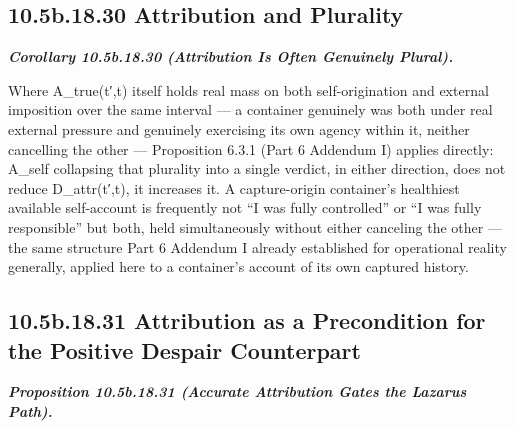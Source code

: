 \documentclass[
]{article}
\begin{document}
\hypertarget{b.18.30-attribution-and-plurality}{%
\subsection{10.5b.18.30 Attribution and
Plurality}\label{b.18.30-attribution-and-plurality}}

\emph{\textbf{Corollary 10.5b.18.30 (Attribution Is Often Genuinely
Plural).}}

Where A\_true(t′,t) itself holds real mass on both self-origination and
external imposition over the same interval --- a container genuinely was
both under real external pressure and genuinely exercising its own
agency within it, neither cancelling the other --- Proposition 6.3.1
(Part 6 Addendum I) applies directly: A\_self collapsing that plurality
into a single verdict, in either direction, does not reduce
D\_attr(t′,t), it increases it. A capture-origin container's healthiest
available self-account is frequently not ``I was fully controlled'' or
``I was fully responsible'' but both, held simultaneously without either
canceling the other --- the same structure Part 6 Addendum I already
established for operational reality generally, applied here to a
container's account of its own captured history.

\hypertarget{b.18.31-attribution-as-a-precondition-for-the-positive-despair-counterpart}{%
\subsection{10.5b.18.31 Attribution as a Precondition for the Positive
Despair
Counterpart}\label{b.18.31-attribution-as-a-precondition-for-the-positive-despair-counterpart}}

\emph{\textbf{Proposition 10.5b.18.31 (Accurate Attribution Gates the
Lazarus Path).}}
\end{document}
